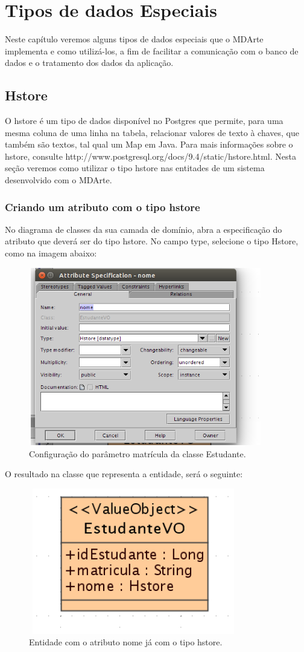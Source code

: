 \chapter{Tipos de dados Especiais}
Neste capítulo veremos alguns tipos de dados especiais que o MDArte implementa e
como utilizá-los, a fim de facilitar a comunicação com o banco de dados e o
tratamento dos dados da aplicação.

\section{Hstore}
O hstore é um tipo de dados disponível no Postgres que permite, para uma mesma
coluna de uma linha na tabela, relacionar valores de texto à chaves, que também
são textos, tal qual um Map em Java.
Para mais informações sobre o hstore, consulte
http://www.postgresql.org/docs/9.4/static/hstore.html.
Nesta seção veremos como utilizar o tipo hstore nas entitades de um sistema
desenvolvido com o MDArte.

\subsection{Criando um atributo com o tipo hstore}
No diagrama de classes da sua camada de domínio, abra a especificação do
atributo que deverá ser do tipo hstore. No campo type, selecione o tipo Hstore,
como na imagem abaixo:
\begin{figure}[H]
	\centering
	\includegraphics[width=290pt,height=220pt]{files/imgs/hstore-0000.png}
	\caption{Configuração do parâmetro matrícula da classe Estudante.}
	\label{config_parametro}
\end{figure}

O resultado na classe que representa a entidade, será o seguinte:
\begin{figure}[H]
	\centering
	\includegraphics[width=260pt,height=180pt]{files/imgs/hstore-0001.png}
	\caption{Entidade com o atributo nome já com o tipo hstore.}
	\label{config_parametro}
\end{figure}